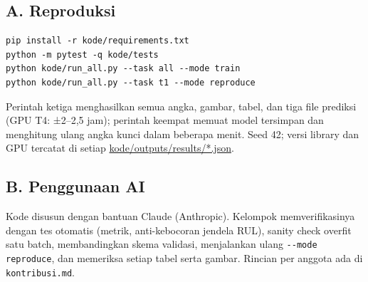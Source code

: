 \subsection*{A. Reproduksi}
\begin{verbatim}
pip install -r kode/requirements.txt
python -m pytest -q kode/tests
python kode/run_all.py --task all --mode train
python kode/run_all.py --task t1 --mode reproduce
\end{verbatim}
Perintah ketiga menghasilkan semua angka, gambar, tabel, dan tiga file prediksi (GPU T4: ±2--2,5 jam); perintah keempat memuat model tersimpan dan menghitung ulang
angka kunci dalam beberapa menit. Seed 42; versi library dan GPU tercatat di setiap \url{kode/outputs/results/*.json}.

\subsection*{B. Penggunaan AI}
Kode disusun dengan bantuan Claude (Anthropic). Kelompok memverifikasinya dengan tes otomatis (metrik, anti-kebocoran jendela RUL), sanity check overfit satu batch,
membandingkan skema validasi, menjalankan ulang \texttt{-{}-mode reproduce}, dan memeriksa setiap tabel serta gambar. Rincian per anggota ada di \texttt{kontribusi.md}.
